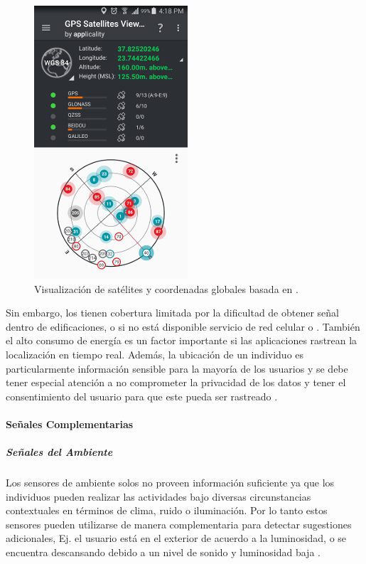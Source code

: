 \begin{figure}[!tbph]
\begin{centering}
\includegraphics[scale=0.8]{capitulo-4/graphics/gps}
\par\end{centering}
\caption[Coordenadas por .]{\label{fig4:gps}Visualización de satélites y coordenadas globales
basada en .}
\end{figure}

Sin embargo, los  tienen cobertura limitada por la dificultad
de obtener señal dentro de edificaciones, o si no está disponible
servicio de red celular o . También el alto consumo de
energía es un factor importante si las aplicaciones rastrean la localización
en tiempo real. Además, la ubicación de un individuo es particularmente
información sensible para la mayoría de los usuarios y se debe tener
especial atención a no comprometer la privacidad de los datos y tener
el consentimiento del usuario para que este pueda ser rastreado \cite{LaraLabrador2013}.

\paragraph{Señales Complementarias}

\subparagraph{Señales del Ambiente}

Los sensores de ambiente solos no proveen información suficiente ya
que los individuos pueden realizar las actividades bajo diversas circunstancias
contextuales en términos de clima, ruido o iluminación. Por lo tanto
estos sensores pueden utilizarse de manera complementaria para detectar
sugestiones adicionales, Ej. el usuario está en el exterior de acuerdo
a la luminosidad, o se encuentra descansando debido a un nivel de
sonido y luminosidad baja \cite{LaraLabrador2013}.

